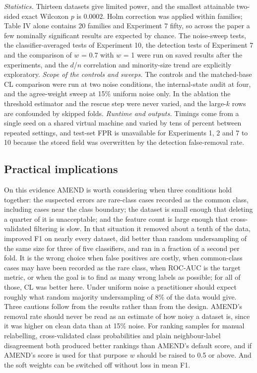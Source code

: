 \documentclass[conference]{IEEEtran}
\begin{document}
\emph{Statistics.} Thirteen datasets give limited power, and the smallest attainable two-sided exact Wilcoxon $p$ is 0.0002. Holm correction was applied within families; Table IV alone contains 20 families and Experiment 7 fifty, so across the paper a few nominally significant results are expected by chance. The noise-sweep tests, the classifier-averaged tests of Experiment 10, the detection tests of Experiment 7 and the comparison of $w$ = 0.7 with $w$ = 1 were run on saved results after the experiments, and the $d$/$n$ correlation and minority-size trend are explicitly exploratory. \emph{Scope of the controls and sweeps.} The controls and the matched-base CL comparison were run at two noise conditions, the internal-state audit at four, and the agree-weight sweep at 15\% uniform noise only. In the ablation the threshold estimator and the rescue step were never varied, and the large-$k$ rows are confounded by skipped folds. \emph{Runtime and outputs.} Timings come from a single seed on a shared virtual machine and varied by tens of percent between repeated settings, and test-set FPR is unavailable for Experiments 1, 2 and 7 to 10 because the stored field was overwritten by the detection false-removal rate.

\subsection{Practical implications}\label{sec:practical-implications}

On this evidence AMEND is worth considering when three conditions hold together: the suspected errors are rare-class cases recorded as the common class, including cases near the class boundary; the dataset is small enough that deleting a quarter of it is unacceptable; and the feature count is large enough that cross-validated filtering is slow. In that situation it removed about a tenth of the data, improved F1 on nearly every dataset, did better than random undersampling of the same size for three of five classifiers, and ran in a fraction of a second per fold. It is the wrong choice when false positives are costly, when common-class cases may have been recorded as the rare class, when ROC-AUC is the target metric, or when the goal is to find as many wrong labels as possible; for all of those, CL was better here. Under uniform noise a practitioner should expect roughly what random majority undersampling of 8\% of the data would give. Three cautions follow from the results rather than from the design. AMEND's removal rate should never be read as an estimate of how noisy a dataset is, since it was higher on clean data than at 15\% noise. For ranking samples for manual relabelling, cross-validated class probabilities and plain neighbour-label disagreement both produced better rankings than AMEND's default score, and if AMEND's score is used for that purpose $w$ should be raised to 0.5 or above. And the soft weights can be switched off without loss in mean F1.
\end{document}
